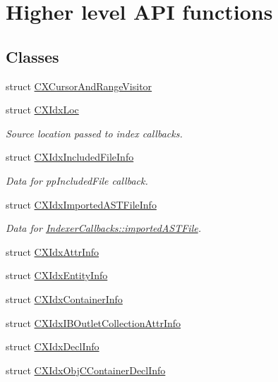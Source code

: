 \hypertarget{group__CINDEX__HIGH}{}\section{Higher level A\+PI functions}
\label{group__CINDEX__HIGH}
\subsection*{Classes}
\begin{DoxyCompactItemize}
\item 
struct \mbox{\hyperlink{structCXCursorAndRangeVisitor}{C\+X\+Cursor\+And\+Range\+Visitor}}
\item 
struct \mbox{\hyperlink{structCXIdxLoc}{C\+X\+Idx\+Loc}}
\begin{DoxyCompactList}\small\item\em Source location passed to index callbacks. \end{DoxyCompactList}\item 
struct \mbox{\hyperlink{structCXIdxIncludedFileInfo}{C\+X\+Idx\+Included\+File\+Info}}
\begin{DoxyCompactList}\small\item\em Data for pp\+Included\+File callback. \end{DoxyCompactList}\item 
struct \mbox{\hyperlink{structCXIdxImportedASTFileInfo}{C\+X\+Idx\+Imported\+A\+S\+T\+File\+Info}}
\begin{DoxyCompactList}\small\item\em Data for \mbox{\hyperlink{structIndexerCallbacks_a75672a9934f69854080bee3fbc0e3994}{Indexer\+Callbacks\+::imported\+A\+S\+T\+File}}. \end{DoxyCompactList}\item 
struct \mbox{\hyperlink{structCXIdxAttrInfo}{C\+X\+Idx\+Attr\+Info}}
\item 
struct \mbox{\hyperlink{structCXIdxEntityInfo}{C\+X\+Idx\+Entity\+Info}}
\item 
struct \mbox{\hyperlink{structCXIdxContainerInfo}{C\+X\+Idx\+Container\+Info}}
\item 
struct \mbox{\hyperlink{structCXIdxIBOutletCollectionAttrInfo}{C\+X\+Idx\+I\+B\+Outlet\+Collection\+Attr\+Info}}
\item 
struct \mbox{\hyperlink{structCXIdxDeclInfo}{C\+X\+Idx\+Decl\+Info}}
\item 
struct \mbox{\hyperlink{structCXIdxObjCContainerDeclInfo}{C\+X\+Idx\+Obj\+C\+Container\+Decl\+Info}}

\end{DoxyCompactItemize}
